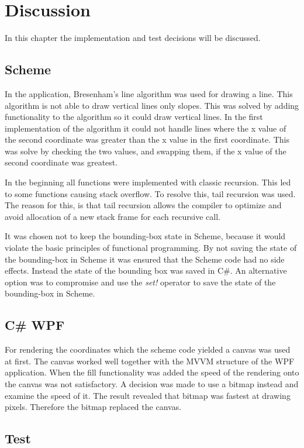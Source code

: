 \chapter{Discussion}
\label{chp:disc}

In this chapter the implementation and test decisions will be discussed. 

\section{Scheme}
In the application, Bresenham’s line algorithm was used for drawing a line. This algorithm is not able to draw vertical lines only slopes. This was solved by adding functionality to the algorithm so it could draw vertical lines. In the first implementation of the algorithm it could not handle lines where the x value of the second coordinate was greater than the x value in the first coordinate. This was solve by checking the two values, and swapping them, if the x value of the second coordinate was greatest.

In the beginning all functions were implemented with classic recursion. This led to some functions causing stack overflow. To resolve this, tail recursion was used. The reason for this, is that tail recursion allows the compiler to optimize and avoid allocation of a new stack frame for each recursive call. 

It was chosen not to keep the bounding-box state in Scheme, because it would violate the basic principles of functional programming. By not saving the state of the bounding-box in Scheme it was ensured that the Scheme code had no side effects. Instead the state of the bounding box was saved in C\#. An alternative option was to compromise and use the \emph{set!} operator to save the state of the bounding-box in Scheme.

\section{C\# WPF}
For rendering the coordinates which the scheme code yielded a canvas was used at first. The canvas worked well together with the MVVM structure of the WPF application. When the fill functionality was added the speed of the rendering onto the canvas was not satisfactory. A decision was made to use a bitmap instead and examine the speed of it. The result revealed that bitmap was fastest at drawing pixels. Therefore the bitmap replaced the canvas. 

\section{Test}

